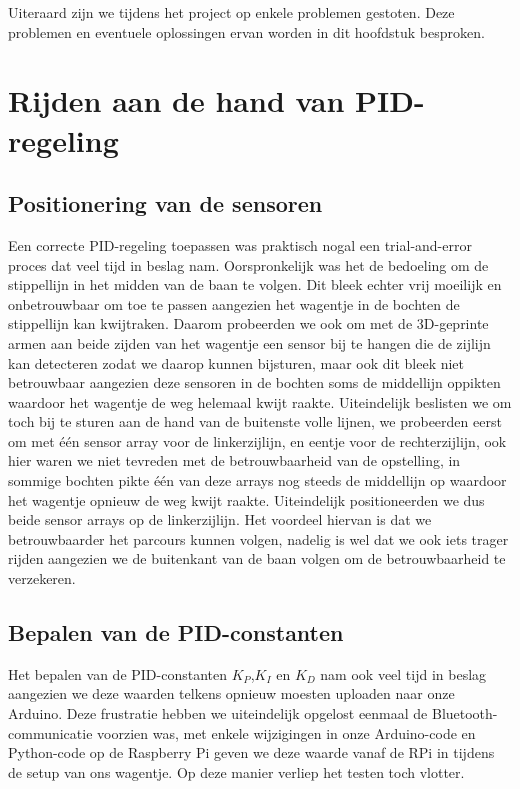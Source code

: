 Uiteraard zijn we tijdens het project op enkele problemen gestoten. Deze problemen en eventuele oplossingen ervan worden in dit hoofdstuk besproken.

\section{Rijden aan de hand van PID-regeling}
\subsection{Positionering van de sensoren}
Een correcte PID-regeling toepassen was praktisch nogal een trial-and-error proces dat veel tijd in beslag nam. Oorspronkelijk was het de bedoeling om de stippellijn in het midden van de baan te volgen. Dit bleek echter vrij moeilijk en onbetrouwbaar om toe te passen aangezien het wagentje in de bochten de stippellijn kan kwijtraken. Daarom probeerden we ook om met de 3D-geprinte armen aan beide zijden van het wagentje een sensor bij te hangen die de zijlijn kan detecteren zodat we daarop kunnen bijsturen, maar ook dit bleek niet betrouwbaar aangezien deze sensoren in de bochten soms de middellijn oppikten waardoor het wagentje de weg helemaal kwijt raakte. Uiteindelijk beslisten we om toch bij te sturen aan de hand van de buitenste volle lijnen, we probeerden eerst om met \'e\'en sensor array voor de linkerzijlijn, en eentje voor de rechterzijlijn, ook hier waren we niet tevreden met de betrouwbaarheid van de opstelling, in sommige bochten pikte \'e\'en van deze arrays nog steeds de middellijn op waardoor het wagentje opnieuw de weg kwijt raakte. Uiteindelijk positioneerden we dus beide sensor arrays op de linkerzijlijn. Het voordeel hiervan is dat we betrouwbaarder het parcours kunnen volgen, nadelig is wel dat we ook iets trager rijden aangezien we de buitenkant van de baan volgen om de betrouwbaarheid te verzekeren.
\subsection{Bepalen van de PID-constanten}
Het bepalen van de PID-constanten $K_P$,$K_I$ en $K_D$ nam ook veel tijd in beslag aangezien we deze waarden telkens opnieuw moesten uploaden naar onze Arduino. Deze frustratie hebben we uiteindelijk opgelost eenmaal de Bluetooth-communicatie voorzien was, met enkele wijzigingen in onze Arduino-code en Python-code op de Raspberry Pi geven we deze waarde vanaf de RPi in tijdens de setup van ons wagentje. Op deze manier verliep het testen toch vlotter.

